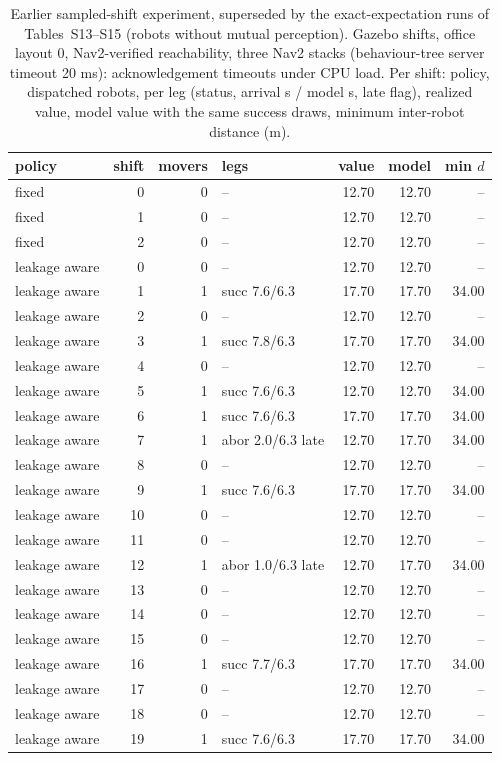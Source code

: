 \begin{table}[h]\centering\caption{Earlier sampled-shift experiment, superseded by the exact-expectation runs of Tables~S13--S15 (robots without mutual perception). Gazebo shifts, office layout 0, Nav2-verified reachability, three Nav2 stacks (behaviour-tree server timeout 20 ms): acknowledgement timeouts under CPU load. Per shift: policy, dispatched robots, per leg (status, arrival s / model s, late flag), realized value, model value with the same success draws, minimum inter-robot distance (m).}\scriptsize
\begin{tabular}{@{}lrrp{3.9cm}rrr@{}}\toprule policy & shift & movers & legs & value & model & min $d$\\\midrule
fixed & 0 & 0 & -- & 12.70 & 12.70 & --\\
fixed & 1 & 0 & -- & 12.70 & 12.70 & --\\
fixed & 2 & 0 & -- & 12.70 & 12.70 & --\\
leakage aware & 0 & 0 & -- & 12.70 & 12.70 & --\\
leakage aware & 1 & 1 & succ 7.6/6.3 & 17.70 & 17.70 & 34.00\\
leakage aware & 2 & 0 & -- & 12.70 & 12.70 & --\\
leakage aware & 3 & 1 & succ 7.8/6.3 & 17.70 & 17.70 & 34.00\\
leakage aware & 4 & 0 & -- & 12.70 & 12.70 & --\\
leakage aware & 5 & 1 & succ 7.6/6.3 & 12.70 & 12.70 & 34.00\\
leakage aware & 6 & 1 & succ 7.6/6.3 & 17.70 & 17.70 & 34.00\\
leakage aware & 7 & 1 & abor 2.0/6.3 late & 12.70 & 17.70 & 34.00\\
leakage aware & 8 & 0 & -- & 12.70 & 12.70 & --\\
leakage aware & 9 & 1 & succ 7.6/6.3 & 17.70 & 17.70 & 34.00\\
leakage aware & 10 & 0 & -- & 12.70 & 12.70 & --\\
leakage aware & 11 & 0 & -- & 12.70 & 12.70 & --\\
leakage aware & 12 & 1 & abor 1.0/6.3 late & 12.70 & 17.70 & 34.00\\
leakage aware & 13 & 0 & -- & 12.70 & 12.70 & --\\
leakage aware & 14 & 0 & -- & 12.70 & 12.70 & --\\
leakage aware & 15 & 0 & -- & 12.70 & 12.70 & --\\
leakage aware & 16 & 1 & succ 7.7/6.3 & 17.70 & 17.70 & 34.00\\
leakage aware & 17 & 0 & -- & 12.70 & 12.70 & --\\
leakage aware & 18 & 0 & -- & 12.70 & 12.70 & --\\
leakage aware & 19 & 1 & succ 7.6/6.3 & 17.70 & 17.70 & 34.00\\
\bottomrule\end{tabular}\end{table}
